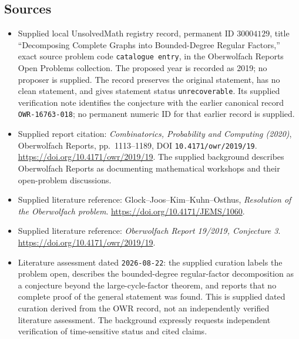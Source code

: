 \documentclass[11pt]{article}
\begin{document}
\subsection{Sources}
\begin{itemize}
\item Supplied local UnsolvedMath registry record, permanent ID \(30004129\), title ``Decomposing Complete Graphs into Bounded-Degree Regular Factors,'' exact source problem code \texttt{catalogue entry}, in the Oberwolfach Reports Open Problems collection. The proposed year is recorded as 2019; no proposer is supplied. The record preserves the original statement, has no clean statement, and gives statement status \texttt{unrecoverable}. Its supplied verification note identifies the conjecture with the earlier canonical record \texttt{OWR-16763-018}; no permanent numeric ID for that earlier record is supplied.
\item Supplied report citation: \emph{Combinatorics, Probability and Computing (2020)}, Oberwolfach Reports, pp.~1113--1189, DOI \texttt{10.4171/owr/2019/19}. \url{https://doi.org/10.4171/owr/2019/19}. The supplied background describes Oberwolfach Reports as documenting mathematical workshops and their open-problem discussions.
\item Supplied literature reference: Glock--Joos--Kim--Kuhn--Osthus, \emph{Resolution of the Oberwolfach problem}. \url{https://doi.org/10.4171/JEMS/1060}.
\item Supplied literature reference: \emph{Oberwolfach Report 19/2019, Conjecture 3}. \url{https://doi.org/10.4171/owr/2019/19}.
\item Literature assessment dated \texttt{2026-08-22}: the supplied curation labels the problem open, describes the bounded-degree regular-factor decomposition as a conjecture beyond the large-cycle-factor theorem, and reports that no complete proof of the general statement was found. This is supplied dated curation derived from the OWR record, not an independently verified literature assessment. The background expressly requests independent verification of time-sensitive status and cited claims.
\end{itemize}
\end{document}
